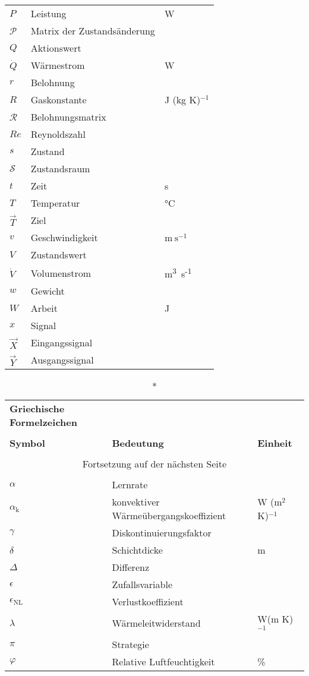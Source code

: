 \begin{onehalfspacing}
\begin{longtable}[h]{p{} p{} p{}}
        $P$& Leistung& \si{\W}\\	
		$\mathcal{P}$&Matrix der Zustandsänderung& \\
		$Q$&Aktionswert&\\
        $\dot{Q}$& Wärmestrom& \si{\W}\\
        $r$&Belohnung&\\
        $R$& Gaskonstante& J (kg K)$^{-1}$\\
 		$\mathcal{R}$ & Belohnungsmatrix&\\
 		$Re$& Reynoldszahl&\\
 		$s$& Zustand&\\
        $\mathcal{S}$&Zustandsraum&\\
        $t$&Zeit&\si{\second}\\	
        $T$&Temperatur& \si{\degreeCelsius}\\
        $\vec{T}$& Ziel&\\
        $v$& Geschwindigkeit&$\si{\meter}~\si{\second}^{-1}$\\ 
        $V$&Zustandswert&\\
        $\dot{V}$&Volumenstrom&\si{m}\textsuperscript{3}~\si{\second}\textsuperscript{-1}\\
        $w$&Gewicht&\\
        $W$& Arbeit&\si{J}\\	
        $x$&Signal&\\
        $\vec{X}$& Eingangssignal&\\
		$\vec{Y}$&Ausgangssignal&\\        
    \end{longtable}

\begin{longtable}[h]{p{} p{} p{}}
	\caption*{\textbf{Griechische Formelzeichen}} \\
	\\
	\textbf{Symbol} & \textbf{Bedeutung} & \textbf{Einheit} \\ %
	\endhead
	\\
	\multicolumn{3}{c}{Fortsetzung auf der nächsten Seite} \\
	\endfoot
	\multicolumn{3}{c}{ } \\
	\endlastfoot
	$\alpha$& Lernrate &\\
	$\alpha_\mathrm{k}$&konvektiver Wärmeübergangskoeffizient&W (m$^2$ K)$^{-1}$\\
	$\gamma$& Diskontinuierungsfaktor&\\
	$\delta$& Schichtdicke& m\\
	$\Delta$& Differenz&\\
	$\epsilon$& Zufallsvariable&\\
	$\epsilon_\mathrm{NL}$& Verlustkoeffizient& \\
	$\lambda$& Wärmeleitwiderstand&W(m K)$^{-1}$\\
	$\pi$& Strategie&\\
	$\varphi$& 	Relative Luftfeuchtigkeit	& \%\\
	

\end{longtable}
\end{onehalfspacing}
